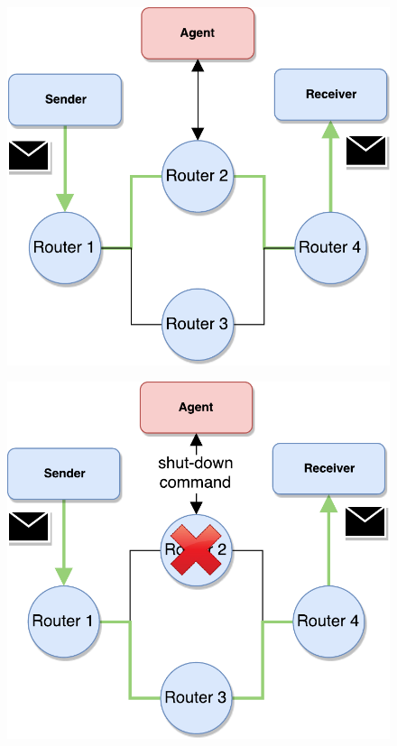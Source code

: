 \begin{figure}[]
\centering
\begin{minipage}{.4\textwidth}
  \centering
  \includegraphics[width=.85\linewidth]{obrazky-figures/agent_1.pdf}
  \label{fig:agent_1}
\end{minipage}%
\begin{minipage}{.4\textwidth}
  \centering
  \includegraphics[width=.85\linewidth]{obrazky-figures/agent_2.pdf}
  \label{fig:agent_2}
\end{minipage}
\end{figure}

